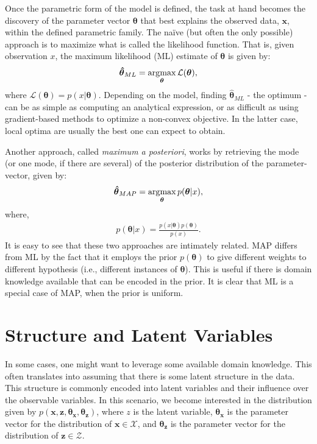 Once the parametric form of the model is defined, the task at hand becomes the
discovery of the parameter vector $\bm{\theta}$ that best explains the observed
data, $\bm{x}$, within the defined parametric family. The naïve (but often the only
possible) approach is to maximize what is called the likelihood function. That
is, given observation $x$, the maximum likelihood (ML) estimate of $\bm\theta$ is
given by:
\begin{align}
    \bm{\hat\theta}_{ML} = \argmax_{\bm{\theta}} \mathcal{L}(\bm{\theta}),
\end{align} where $\mathcal{L}(\bm{\theta}) = p(x | \bm{\theta})$.
Depending on the model, finding $\bm{\hat\theta}_{ML}$ - the optimum -
can be as simple as computing an analytical expression, or as difficult as using
gradient-based methods to optimize a non-convex objective. In the latter case,
local optima are usually the best one can expect to obtain.

Another approach, called \emph{maximum a posteriori}, works by retrieving the
mode (or one mode, if there are several) of the posterior distribution of the
parameter-vector, given by:
\begin{align}
    \bm{\hat\theta}_{MAP} = \argmax_{\bm{\theta}} p(\bm{\theta} | x),
\end{align} where,
\begin{align}
    p(\bm{\theta} | x) = \frac{p(x |\bm{\theta})p(\bm{\theta})}{p(x)}.
\end{align}
It is easy to see that these two approaches are intimately related. MAP differs
from ML by the fact that it employs the prior $p(\bm{\theta})$ to give different
weights to different hypothesis (i.e., different instances of $\bm{\theta}$). This
is useful if there is domain knowledge available that can be encoded in the
prior. It is clear that ML is a special case of MAP, when the prior is
uniform.

\section{Structure and Latent Variables}
\label{section:probmodellatvar}
In some cases, one might want to leverage some available domain knowledge. This
often translates into assuming that there is some latent structure in the data.
This structure is commonly encoded into latent variables and their influence over
the observable variables. In this scenario, we become interested in the distribution
given by
$p(\bm{x}, \bm{z}, \bm{\theta_x}, \bm{\theta_z})$, where $z$ is the latent variable, $\bm{\theta_x}$ is
the parameter vector for the distribution of $\bm{x} \in \bm{\mathcal{X}}$, and $\bm{\theta_z}$ is
the parameter vector for the distribution of $\bm{z} \in \bm{\mathcal{Z}}$.

